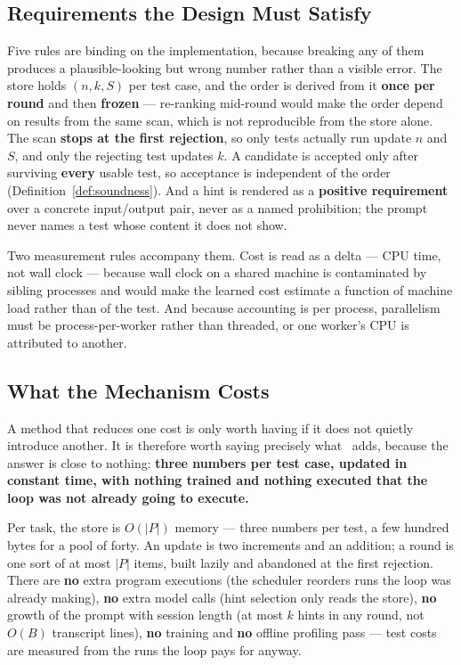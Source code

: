 \subsection{Requirements the Design Must Satisfy}

Five rules are binding on the implementation, because breaking any of them
produces a plausible-looking but wrong number rather than a visible error. The
store holds $(n, k, S)$ per test case, and the order is derived from it
\textbf{once per round} and then \textbf{frozen} --- re-ranking mid-round would
make the order depend on results from the same scan, which is not reproducible
from the store alone. The scan \textbf{stops at the first rejection}, so only
tests actually run update $n$ and $S$, and only the rejecting test updates $k$.
A candidate is accepted only after surviving \textbf{every} usable test, so
acceptance is independent of the order (Definition~\ref{def:soundness}). And a
hint is rendered as a \textbf{positive requirement} over a concrete
input/output pair, never as a named prohibition; the prompt never names a test
whose content it does not show.

Two measurement rules accompany them. Cost is read as a
\allowbreak{} delta --- CPU time, not
wall clock --- because wall clock on a shared machine is contaminated by
sibling processes and would make the learned cost estimate a function of
machine load rather than of the test. And because  accounting
is per process, parallelism must be process-per-worker rather than threaded,
or one worker's CPU is attributed to another.

\subsection{What the Mechanism Costs}
\label{sec:method-cost}

A method that reduces one cost is only worth having if it does not quietly
introduce another. It is therefore worth saying precisely what \caster\ adds,
because the answer is close to nothing: \textbf{three numbers per test case,
updated in constant time, with nothing trained and nothing executed that the
loop was not already going to execute.}

Per task, the store is $O(|P|)$ memory --- three numbers per test, a few
hundred bytes for a pool of forty. An update is two increments and an
addition; a round is one sort of at most $|P|$ items, built lazily and
abandoned at the first rejection. There are \textbf{no} extra program
executions (the scheduler reorders runs the loop was already making), \textbf{no}
extra model calls (hint selection only reads the store), \textbf{no} growth of
the prompt with session length (at most $k$ hints in any round, not $O(B)$
transcript lines), \textbf{no} training and \textbf{no} offline profiling pass
--- test costs are measured from the runs the loop pays for anyway.

